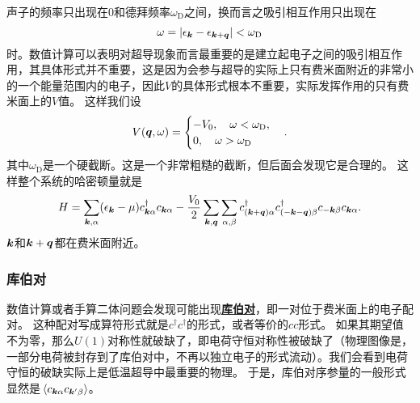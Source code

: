 \documentclass[hyperref, UTF8, a4paper]{ctexart}
\newcommand*{\concept}[1]{\underline{\textbf{#1}}}
\begin{document}
声子的频率只出现在0和德拜频率$\omega_\text{D}$之间，换而言之吸引相互作用只出现在
\[
    \omega = \abs{\epsilon_{\vb*{k}} - \epsilon_{\vb*{k}+\vb*{q}}} < \omega_\text{D}
\]
时。数值计算可以表明对超导现象而言最重要的是建立起电子之间的吸引相互作用，其具体形式并不重要，这是因为会参与超导的实际上只有费米面附近的非常小的一个能量范围内的电子，因此$V$的具体形式根本不重要，实际发挥作用的只有费米面上的$V$值。
这样我们设
\begin{equation}
    V(\vb*{q}, \omega) = \begin{cases}
        - V_0, \quad \omega < \omega_\text{D}, \\
        0, \quad \omega > \omega_\text{D}
    \end{cases}.
    \label{eq:superconductive-interaction-simplified}
\end{equation}
其中$\omega_\text{D}$是一个硬截断。这是一个非常粗糙的截断，但后面会发现它是合理的。
这样整个系统的哈密顿量就是
\begin{equation}
    {H} = \sum_{\vb*{k}, \alpha} (\epsilon_{\vb*{k}} - \mu) {c}_{\vb*{k} \alpha}^\dagger {c}_{\vb*{k} \alpha} - \frac{V_0}{2} \sum_{\vb*{k}, \vb*{q}} \sum_{\alpha, \beta} {c}^\dagger_{(\vb*{k} + \vb*{q}) \alpha} {c}^\dagger_{( - \vb*{k} - \vb*{q}) \beta} {c}_{-\vb*{k} \beta} {c}_{\vb*{k} \alpha}.
    \label{eq:simple-super-conductive-hamiltonian}
\end{equation}
$\vb*{k}$和$\vb*{k}+\vb*{q}$都在费米面附近。

\subsubsection{库伯对}

数值计算或者手算二体问题会发现可能出现\concept{库伯对}，即一对位于费米面上的电子配对。
这种配对写成算符形式就是${c}^\dagger {c}^\dagger$的形式，或者等价的${c} {c}$形式。
如果其期望值不为零，那么$U(1)$对称性就破缺了，即电荷守恒对称性被破缺了（物理图像是，一部分电荷被封存到了库伯对中，不再以独立电子的形式流动）。我们会看到电荷守恒的破缺实际上是低温超导中最重要的物理。
于是，库伯对序参量的一般形式显然是$\expval*{{c}_{\vb*{k}\alpha} {c}_{\vb*{k}' \beta}}$。
\end{document}
